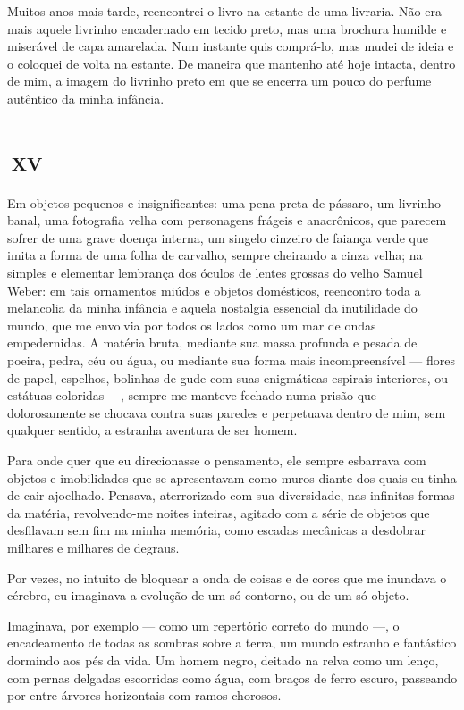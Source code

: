 Muitos anos mais tarde, reencontrei o livro na estante de uma livraria. Não era mais aquele livrinho encadernado em tecido preto, mas uma brochura humilde e miserável de capa amarelada. Num instante quis comprá-lo, mas mudei de ideia e o coloquei de volta na estante. De maneira que mantenho até hoje intacta, dentro de mim, a imagem do livrinho preto em que se encerra um pouco do perfume autêntico da minha infância.


\chapter*{\small{}\,\Large\centering\textsc{xv}\,\small{}}

Em objetos pequenos e insignificantes: uma pena preta de pássaro, um livrinho banal, uma fotografia velha com personagens frágeis e anacrônicos, que parecem sofrer de uma grave doença interna, um singelo cinzeiro de faiança verde que imita a forma de uma folha de carvalho, sempre cheirando a cinza velha; na simples e elementar lembrança dos óculos de lentes grossas do velho Samuel Weber: em tais ornamentos miúdos e objetos domésticos, reencontro toda a melancolia da minha infância e aquela nostalgia essencial da inutilidade do mundo, que me envolvia por todos os lados como um mar de ondas empedernidas. A matéria bruta, mediante sua massa profunda e pesada de poeira, pedra, céu ou água, ou mediante sua forma mais incompreensível --- flores de papel, espelhos, bolinhas de gude com suas enigmáticas espirais interiores, ou estátuas coloridas ---, sempre me manteve fechado numa prisão que dolorosamente se chocava contra suas paredes e perpetuava dentro de mim, sem qualquer sentido, a estranha aventura de ser homem.

Para onde quer que eu direcionasse o pensamento, ele sempre esbarrava com objetos e imobilidades que se apresentavam como muros diante dos quais eu tinha de cair ajoelhado.
Pensava, aterrorizado com sua diversidade, nas infinitas formas da matéria, revolvendo-me noites inteiras, agitado com a série de objetos que desfilavam sem fim na minha memória, como escadas mecânicas a desdobrar milhares e milhares de degraus.

Por vezes, no intuito de bloquear a onda de coisas e de cores que me inundava o cérebro, eu imaginava a evolução de um só contorno, ou de um só objeto.

Imaginava, por exemplo --- como um repertório correto do mundo ---, o encadeamento de todas as sombras sobre a terra, um mundo estranho e fantástico dormindo aos pés da vida.
Um homem negro, deitado na relva como um lenço, com pernas delgadas escorridas como água, com braços de ferro escuro, passeando por entre árvores horizontais com ramos chorosos.

